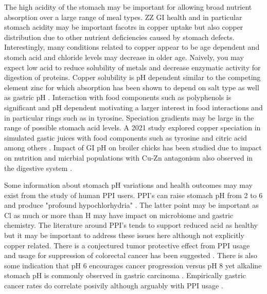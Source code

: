 {

The high acidity of the stomach may be important for
allowing broad nutrient absorption over a large range of meal
types. ZZ
GI health and in particular stomach acidity may be important
facotrs in copper uptake but also copper distribution due to
other nutrient deficiencies caused by stomach defects.  
Interestingly, many conditions related to copper appear to be
age dependent and stomch acid and chloride levels may decrease
in older age.
Naively, you may expect
low acid to reduce solubility of  metals
and decrease enzymatic activity for digestion of proteins. 
Copper solubility is pH dependent \cite{10.1093/chemse/bjl010}
similar to the competing element zinc for which absorption
 has been shown to depend on salt type as well as 
gastric pH \cite{PMID8577018}.
Interaction with food components such as polyphenols is significant
and pH dependent 
\cite{PMC3401972} motivating a larger interest in food interactions
and in particular rings such as in tyrosine. 
Speciation gradients
may be large in the range of possible stomach acid levels.  
A 2021 study explored copper speciation in simulated
gastic juices with food components such as 
tyrosine and citric acid among others \cite{PMC8441336}.
Impact of GI pH on broiler chicks has been studied due to impact
on nutrition and micrbial populations 
with  Cu-Zn antagonism also observed in the digestive system 
\cite{Pang_Applegate_Effects_Dietary_Copper_2007}.

Some information about stomach pH variations and health outcomes
may may exist from the study of human PPI users.
PPI's  can raise stomach pH from 2 to 6 and produce "profound 
hypochlorhydria" \cite{PMC4254461}. The latter point may be
important as Cl as much or more  than H may have impact on microbiome
and gastric chemistry.  The literature around PPI's tends to 
support reduced acid as healthy but it may be important to address
these issues here although not explicitly copper related. 
There is  a conjectured tumor protective effect from PPI usage
and usage for suppression of colorectal cancer has been suggested
\cite{Kim_Lee_Hong_Novel_Application_Proton_}.
There is also some indication that pH 6 encourages cancer progression
versus pH 8 \cite{PMC7085403}
yet alkaline stomach pH is commonly observed
in gastric carcinoma \cite{10.1007/978-4-431-68246-2_26}.
Empirically gastric cancer rates do correlate 
posivily although arguably with PPI usage
\cite{Waldum_Sordal_Fossmark_Proton_pump_inhibitors_PPIs_2018}
\cite{Segna_Brusselaers_Glaus_Association_between_proton_pump_2021}
\cite{PMC10308480}
.

}
